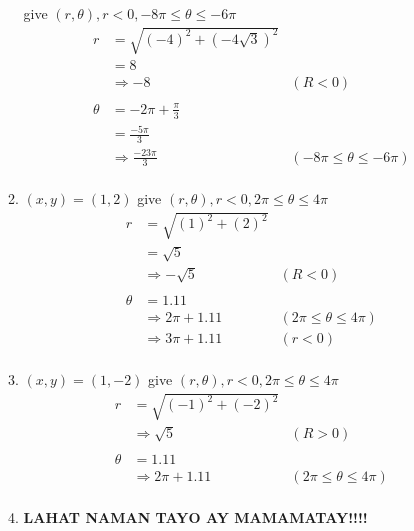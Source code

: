 \documentclass{article}
\begin{document}
\begin{enumerate}
\begin{enumerate}
        give $(r,\theta), r<0, -8\pi\le\theta\le-6\pi$ \\
        \begin{align*}
            r&=\sqrt{(-4)^2+(-4\sqrt{3})^2} \\
            &=8 \\
            &\Rightarrow-8&(R<0) \\
            \\
            \theta&=-2\pi+\frac{\pi}{3} \\
            &=\frac{-5\pi}{3} \\
            &\Rightarrow\frac{-23\pi}{3}&(-8\pi\le\theta\le-6\pi) \\
        \end{align*}
        \item \textbf{$(x,y)=(1,2)$}
        give $(r,\theta), r<0, 2\pi\le\theta\le4\pi$ \\
        \begin{align*}
            r&=\sqrt{(1)^2+(2)^2} \\
            &=\sqrt{5} \\
            &\Rightarrow -\sqrt{5}&(R<0) \\
            \\
            \theta&=1.11 \\
            &\Rightarrow2\pi+1.11&(2\pi\le\theta\le4\pi) \\
            &\Rightarrow3\pi+1.11&(r<0) \\
        \end{align*}
        \item \textbf{$(x,y)=(1,-2)$}
        give $(r,\theta), r<0, 2\pi\le\theta\le4\pi$ \\
        \begin{align*}
            r&=\sqrt{(-1)^2+(-2)^2} \\
            &\Rightarrow\sqrt{5}&(R>0) \\
            \\
            \theta&=1.11 \\
            &\Rightarrow2\pi+1.11&(2\pi\le\theta\le4\pi) \\
        \end{align*}
        \item \textbf{LAHAT NAMAN TAYO AY MAMAMATAY!!!!} \\

\end{enumerate}
\end{enumerate}
\end{document}
